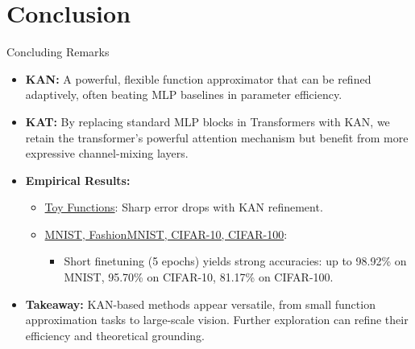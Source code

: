 \documentclass{beamer}
\begin{document}
\section{Conclusion}
\begin{frame}{Concluding Remarks}
    \begin{itemize}
        \item \textbf{KAN:} A powerful, flexible function approximator that can be refined adaptively, often beating MLP baselines in parameter efficiency.
        \item \textbf{KAT:} By replacing standard MLP blocks in Transformers with KAN, we retain the transformer's powerful attention mechanism but benefit from more expressive channel-mixing layers.
        \item \textbf{Empirical Results:}
              \begin{itemize}
                  \item \underline{Toy Functions}: Sharp error drops with KAN refinement.
                  \item \underline{MNIST, FashionMNIST, CIFAR-10, CIFAR-100}:
                        \begin{itemize}
                            \item Short finetuning (5 epochs) yields strong accuracies: up to 98.92\% on MNIST, 95.70\% on CIFAR-10, 81.17\% on CIFAR-100.
                        \end{itemize}
              \end{itemize}
        \item \textbf{Takeaway:} KAN-based methods appear versatile, from small function approximation tasks to large-scale vision. Further exploration can refine their efficiency and theoretical grounding.
    \end{itemize}
\end{frame}
\end{document}
